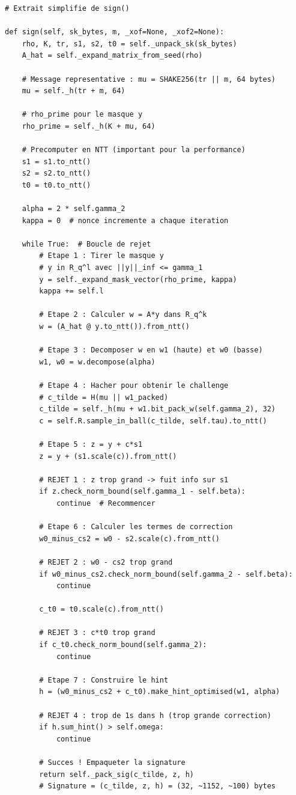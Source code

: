 \documentclass[12pt, a4paper]{article}
\begin{document}
\begin{lstlisting}[style=python]
# Extrait simplifie de sign()

def sign(self, sk_bytes, m, _xof=None, _xof2=None):
    rho, K, tr, s1, s2, t0 = self._unpack_sk(sk_bytes)
    A_hat = self._expand_matrix_from_seed(rho)

    # Message representative : mu = SHAKE256(tr || m, 64 bytes)
    mu = self._h(tr + m, 64)

    # rho_prime pour le masque y
    rho_prime = self._h(K + mu, 64)

    # Precomputer en NTT (important pour la performance)
    s1 = s1.to_ntt()
    s2 = s2.to_ntt()
    t0 = t0.to_ntt()

    alpha = 2 * self.gamma_2
    kappa = 0  # nonce incremente a chaque iteration

    while True:  # Boucle de rejet
        # Etape 1 : Tirer le masque y
        # y in R_q^l avec ||y||_inf <= gamma_1
        y = self._expand_mask_vector(rho_prime, kappa)
        kappa += self.l

        # Etape 2 : Calculer w = A*y dans R_q^k
        w = (A_hat @ y.to_ntt()).from_ntt()

        # Etape 3 : Decomposer w en w1 (haute) et w0 (basse)
        w1, w0 = w.decompose(alpha)

        # Etape 4 : Hacher pour obtenir le challenge
        # c_tilde = H(mu || w1_packed)
        c_tilde = self._h(mu + w1.bit_pack_w(self.gamma_2), 32)
        c = self.R.sample_in_ball(c_tilde, self.tau).to_ntt()

        # Etape 5 : z = y + c*s1
        z = y + (s1.scale(c)).from_ntt()

        # REJET 1 : z trop grand -> fuit info sur s1
        if z.check_norm_bound(self.gamma_1 - self.beta):
            continue  # Recommencer

        # Etape 6 : Calculer les termes de correction
        w0_minus_cs2 = w0 - s2.scale(c).from_ntt()

        # REJET 2 : w0 - cs2 trop grand
        if w0_minus_cs2.check_norm_bound(self.gamma_2 - self.beta):
            continue

        c_t0 = t0.scale(c).from_ntt()

        # REJET 3 : c*t0 trop grand
        if c_t0.check_norm_bound(self.gamma_2):
            continue

        # Etape 7 : Construire le hint
        h = (w0_minus_cs2 + c_t0).make_hint_optimised(w1, alpha)

        # REJET 4 : trop de 1s dans h (trop grande correction)
        if h.sum_hint() > self.omega:
            continue

        # Succes ! Empaqueter la signature
        return self._pack_sig(c_tilde, z, h)
        # Signature = (c_tilde, z, h) = (32, ~1152, ~100) bytes
\end{lstlisting}
\end{document}
